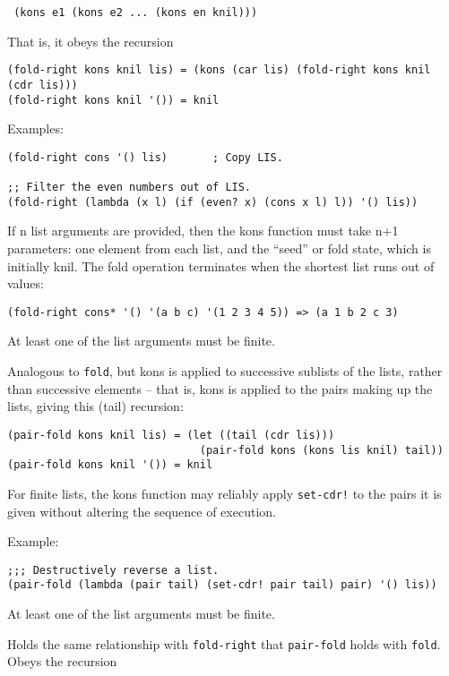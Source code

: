 \begin{description}
\texttt{\ (kons\ e1\ (kons\ e2\ ...\ (kons\ en\ knil)))}

That is, it obeys the recursion

\begin{verbatim}
(fold-right kons knil lis) = (kons (car lis) (fold-right kons knil (cdr lis)))
(fold-right kons knil '()) = knil
\end{verbatim}

Examples:

\begin{verbatim}
(fold-right cons '() lis)       ; Copy LIS.

;; Filter the even numbers out of LIS.
(fold-right (lambda (x l) (if (even? x) (cons x l) l)) '() lis))
\end{verbatim}

If n list arguments are provided, then the kons function must take n+1
parameters: one element from each list, and the ``seed'' or fold state,
which is initially knil. The fold operation terminates when the shortest
list runs out of values:

\begin{verbatim}
(fold-right cons* '() '(a b c) '(1 2 3 4 5)) => (a 1 b 2 c 3)
\end{verbatim}

At least one of the list arguments must be finite.
\item[ \href{}{} \texttt{pair-fold} kons knil clist\textsubscript{1}
clist\textsubscript{2} \ldots{} -\textgreater{} value ]
Analogous to \texttt{fold}, but kons is applied to successive sublists
of the lists, rather than successive elements -- that is, kons is
applied to the pairs making up the lists, giving this (tail) recursion:

\begin{verbatim}
(pair-fold kons knil lis) = (let ((tail (cdr lis)))
                              (pair-fold kons (kons lis knil) tail))
(pair-fold kons knil '()) = knil
\end{verbatim}

For finite lists, the kons function may reliably apply \texttt{set-cdr!}
to the pairs it is given without altering the sequence of execution.

Example:

\begin{verbatim}
;;; Destructively reverse a list.
(pair-fold (lambda (pair tail) (set-cdr! pair tail) pair) '() lis))
\end{verbatim}

At least one of the list arguments must be finite.
\item[ \href{}{} \texttt{pair-fold-right} kons knil
clist\textsubscript{1} clist\textsubscript{2} \ldots{} -\textgreater{}
value ]
Holds the same relationship with \texttt{fold-right} that
\texttt{pair-fold} holds with \texttt{fold}. Obeys the recursion


\end{description}
